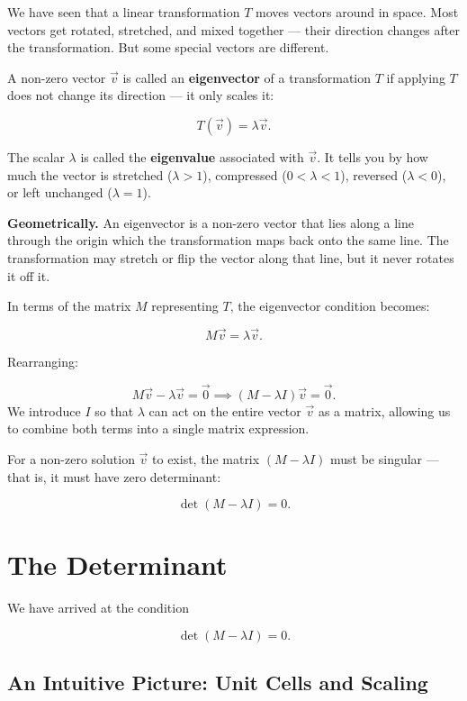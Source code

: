 \documentclass[11pt,openany]{book}
\theoremstyle{definition}
\begin{document}
We have seen that a linear transformation $T$ moves vectors around in space. Most
vectors get rotated, stretched, and mixed together --- their direction changes after
the transformation. But some special vectors are different.

\medskip

A non-zero vector $\vec{v}$ is called an \textbf{eigenvector} of a transformation
$T$ if applying $T$ does not change its direction --- it only scales it:

\[
T(\vec{v}) = \lambda \vec{v}.
\]

The scalar $\lambda$ is called the \textbf{eigenvalue} associated with $\vec{v}$.
It tells you by how much the vector is stretched ($\lambda > 1$), compressed
($0 < \lambda < 1$), reversed ($\lambda < 0$), or left unchanged ($\lambda = 1$).

\medskip

\textbf{Geometrically.} An eigenvector is a non-zero vector that lies along a line through the origin
which the transformation maps back onto the same line. The transformation may stretch
or flip the vector along that line, but it never rotates it off it.

\medskip

In terms of the matrix $M$ representing $T$, the eigenvector condition becomes:

\[
M\vec{v} = \lambda\vec{v}.
\]

Rearranging:

\[
M\vec{v} - \lambda\vec{v} = \vec{0}
\implies
(M - \lambda I)\vec{v} = \vec{0}.
\]
We introduce $I$ so that $\lambda$ can act on the entire vector $\vec{v}$ as a matrix, allowing us to combine both terms into a single matrix expression.

\medskip

For a non-zero solution $\vec{v}$ to exist, the matrix $(M - \lambda I)$ must be
singular --- that is, it must have zero determinant:

\[
\det(M - \lambda I) = 0.
\]

\section{The Determinant}

We have arrived at the condition

\[
\det(M - \lambda I) = 0.
\]

\subsection{An Intuitive Picture: Unit Cells and Scaling}
\end{document}
